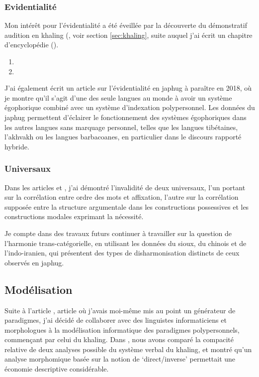 \documentclass[oldfontcommands,oneside,a4paper,11pt]{article}
\begin{document}
\subsubsection{Evidentialité}\label{sec:evd}
Mon intérêt pour l'évidentialité a été éveillée par la découverte du démonstratif audition en khaling (\citealt{jacques14auditory}, voir section \ref{sec:khaling}, suite auquel j'ai écrit un chapitre d'encyclopédie (\citealt{jacques18nonpropositional}).

\begin{enumerate}
\item  {}
\item  {}
\end{enumerate} 


J'ai également écrit un article sur l'évidentialité en japhug à paraître en 2018, où je montre qu'il s'agit d'une des seule langues au monde à avoir un système égophorique combiné avec un système d'indexation polypersonnel. Les données du japhug permettent d'éclairer le fonctionnement des systèmes égophoriques dans les autres langues sans marquage personnel, telles que les langues tibétaines, l'akhvakh ou les langues barbacoanes, en particulier dans le discours rapporté hybride.  

\subsubsection{Universaux}
Dans les articles \citet{jacques13harmonization} et \citet{antonov14need}, j'ai démontré l'invalidité de deux universaux, l'un portant sur la corrélation entre ordre des mots et affixation, l'autre sur la corrélation supposée entre la structure argumentale dans les  constructions possessives et les constructions modales exprimant la nécessité.

Je compte dans des travaux futurs continuer à travailler sur la question de l'harmonie trans-catégorielle, en utilisant les données du sioux, du chinois et de l'indo-iranien, qui présentent des types de disharmonisation distincts de ceux observés en japhug.


\subsection{Modélisation} \label{sec:modelisation}
Suite à l'article \citet{jacques12khaling}, article où j'avais moi-même mis au point un générateur de paradigmes, j'ai décidé de collaborer avec des linguistes informaticiens et morphologues à la modélisation informatique des paradigmes polypersonnels, commençant par celui du khaling. Dans \citet{walther14compactness}, nous avons comparé la compacité relative de deux analyses possible du système verbal du khaling, et montré qu'un analyse morphomique basée sur la notion de `direct/inverse' permettait une économie descriptive considérable.
\end{document}
